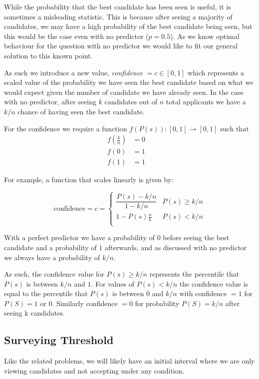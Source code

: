 \documentclass[a4paper,11pt]{article}
\begin{document}
While the probability that the best candidate has been seen is useful, it is sometimes a misleading statistic. This is because after seeing a majority of candidates, we may have a high probability of the best candidate being seen, but this would be the case even with no predictor ($p = 0.5$). As we know optimal behaviour for the question with no predictor we would like to fit our general solution to this known point.

As such we introduce a new value, \textit{confidence} $ = c\in [0,1]$ which represents a scaled value of the probability we have seen the best candidate based on what we would expect given the number of candidate we have already seen. In the case with no predictor, after seeing $k$ candidates out of $n$ total applicants we have a $k/n$ chance of having seen the best candidate.

For the confidence we require a function $f(P(s)): [0,1] \rightarrow [0,1] \text{ such that}$
\begin{align}
f\left(\frac{k}{n}\right) &= 0 \quad\\
f(0) &= 1\\
f(1) &= 1
\end{align}

For example, a function that scales linearly is given by:

$$
\text{confidence} = c = \begin{cases}
   \dfrac{P(s) - k/n}{1 - k/n} & P(s) \ge k/n\\[8pt]
  1- P(s)\frac{n}{k} & P(s) < k/n\\
\end{cases}
$$

With a perfect predictor we have a probability of $0$ before seeing the best candidate and a probability of $1$ afterwards, and as discussed with no predictor we always have a probability of $k/n$.

As such, the confidence value for $P(s) \ge k/n$ represents the percentile that $P(s)$ is between $k/n$ and $1$. For values of $P(s) < k/n$ the confidence value is equal to the percentile that $P(s)$ is between $0$ and $k/n$ with confidence $= 1$ for $P(S) =1$ or $0$. Similarly confidence $= 0$ for probability $P(S) = k/n$ after seeing k candidates.

\subsection{Surveying Threshold}

Like the related problems, we will likely have an initial interval where we are only viewing candidates and not accepting under any condition.
\end{document}

